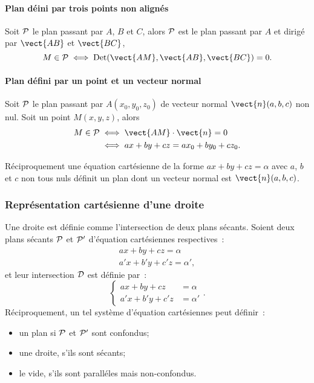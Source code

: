 \paragraph{Plan déini par trois points non alignés}

Soit $\P$ le plan passant par $A$, $B$ et $C$, alors $\P$ est le plan passant par $A$ et dirigé par $\vect{AB}$ et $\vect{BC}$,
\begin{equation}
  M \in \P \iff \Det(\vect{AM},\vect{AB},\vect{BC})=0.
\end{equation}

\paragraph{Plan défini par un point et un vecteur normal}

Soit $\P$ le plan passant par $A(x_0,y_0,z_0)$ de vecteur normal $\vect{n}(a,b,c)$ non nul. Soit un point $M(x,y,z)$, alors
\begin{align}
  M \in \P &\iff \vect{AM}\cdot\vect{n}=0 \\
  &\iff ax+by+cz=ax_0+by_0+cz_0.
\end{align}

Réciproquement une équation cartésienne de la forme $ax+by+cz=\alpha$ avec $a$, $b$ et $c$ non tous nuls définit un plan dont un vecteur normal est $\vect{n}(a,b,c)$.

\subsubsection{Représentation cartésienne d'une droite}

Une droite est définie comme l'intersection de deux plans sécants. Soient deux plans sécants $\P$ et $\P'$ d'équation cartésiennes respectives~:
\begin{align}
  ax+by+cz=\alpha \\ a'x+b'y+c'z=\alpha',
\end{align}
et leur intersection $\Dr$ est définie par~:
\begin{equation}
 \begin{cases} ax+by+cz&=\alpha \\ a'x+b'y+c'z&=\alpha'\end{cases}.
\end{equation}
Réciproquement, un tel système d'équation cartésiennes peut définir~:
\begin{itemize}
\item un plan si $\P$ et $\P'$ sont confondus;
\item une droite, s'ils sont sécants;
\item le vide, s'ils sont paralléles mais non-confondus.
\end{itemize}

